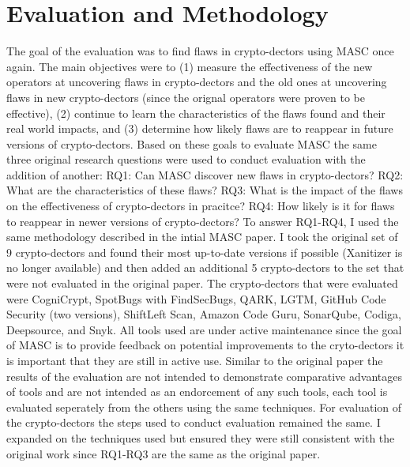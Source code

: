 \chapter{Evaluation and Methodology}
\label{chap_evaluation}

The goal of the evaluation was to find flaws in crypto-dectors using MASC once again. The main objectives were to (1) measure the effectiveness of the new operators at uncovering flaws in crypto-dectors and the old ones at uncovering flaws in new crypto-dectors (since the orignal operators were proven to be effective), (2) continue to learn the characteristics of the flaws found and their real world impacts, and (3) determine how likely flaws are to reappear in future versions of crypto-dectors. Based on these goals to evaluate MASC the same three original research questions were used to conduct evaluation with the addition of another:
RQ1: Can MASC discover new flaws in crypto-dectors?
RQ2: What are the characteristics of these flaws?
RQ3: What is the impact of the flaws on the effectiveness of crypto-dectors in pracitce?
RQ4: How likely is it for flaws to reappear in newer versions of crypto-dectors?
To answer RQ1-RQ4, I used the same methodology described in the intial MASC paper. I took the original set of 9 crypto-dectors and found their most up-to-date versions if possible (Xanitizer is no longer available) and then added an additional 5 crypto-dectors to the set that were not evaluated in the original paper. The crypto-dectors that were evaluated were CogniCrypt, SpotBugs with FindSecBugs, QARK, LGTM, GitHub Code Security (two versions), ShiftLeft Scan, Amazon Code Guru, SonarQube, Codiga, Deepsource, and Snyk. All tools used are under active maintenance since the goal of MASC is to provide feedback on potential improvements to the cryto-dectors it is important that they are still in active use. Similar to the original paper the results of the evaluation are not intended to demonstrate comparative advantages of tools and are not intended as an endorcement of any such tools, each tool is evaluated seperately from the others using the same techniques.
For evaluation of the crypto-dectors the steps used to conduct evaluation remained the same. I expanded on the techniques used but ensured they were still consistent with the original work since RQ1-RQ3 are the same as the original paper.
